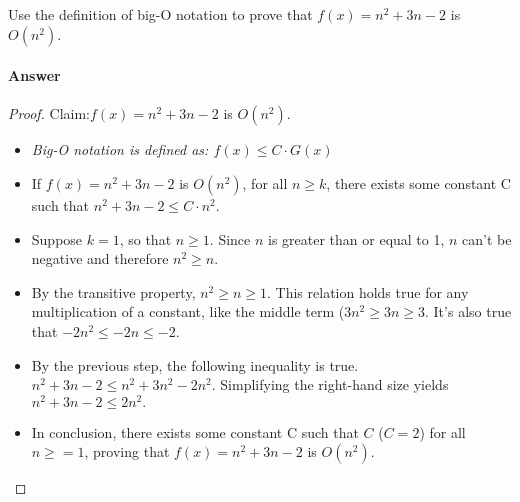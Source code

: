 \documentclass{article}
\begin{document}
Use the definition of big-O notation to prove that $f(x)=n^2 + 3n -2$ is
$O(n^2)$.

\paragraph{Answer}
\begin{proof}{Claim:}{$f(x)=n^2 + 3n -2$ is $O(n^2)$.} 
\begin{itemize}
\item \emph{Big-O notation is defined as: $f(x) \leq C\cdot{G(x)}$}
\item { If $f(x)=n^2 + 3n - 2$ is $O(n^2)$, for all $n \geq k$, there exists some constant C such that $n^2 + 3n - 2 \leq C\cdot{n^2}$.}
\item{Suppose $k = 1$, so that $n \geq 1.$ Since $n$ is greater than or equal to 1, $n$ can't be negative and therefore $n^2 \geq n$.}
\item{By the transitive property, $n^2 \geq n \geq 1$. This relation holds true for any multiplication of a constant, like the middle term ($3n^2 \geq 3n \geq 3$. It's also true that $-2n^2 \leq -2n \leq -2.$}
\item{By the previous step, the following inequality is true. $n^2 + 3n - 2 \leq n^2 + 3n^2 - 2n^2.$ Simplifying the right-hand size yields $n^2 + 3n - 2 \leq 2n^2.$}
\item{In conclusion, there exists some constant C such that $C$ ($C = 2$) for all $n \geq = 1$, proving that $f(x)=n^2 + 3n -2$ is $O(n^2)$.}
\end{itemize}
\end{proof}
\end{document}
